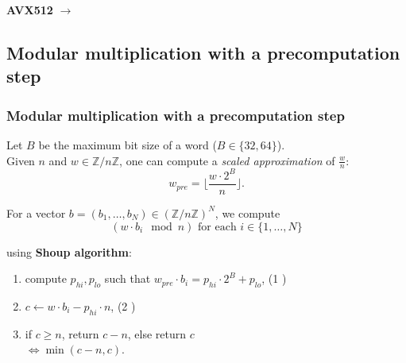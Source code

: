 \documentclass[10pt]{beamer}
\begin{document}
\begin{frame}
    \pause
    \medskip
    \textbf{AVX512} $\longrightarrow$ 
    \begin{table}[h!]
        \centering
    \end{table}
\end{frame}

\subsection{Modular multiplication with a precomputation step}
\begin{frame}
    \frametitle{Modular multiplication with a precomputation step}

    \begin{mybox}
        Let $B$ be the maximum bit size of a word ($B\in \{32, 64\}$). \\
        Given $n$ and $w \in \mathbb{Z}/n\mathbb{Z}$, one can compute a \textit{scaled approximation} 
        of $\frac{w}{n}$: $$ w_{pre} = \biggl\lfloor\dfrac{w\cdot 2^{B}}{n} \biggr\rfloor.$$
    \end{mybox}

    \pause
    \bigskip
    For a vector $b = (b_1,\dots, b_N) \in (\mathbb{Z}/n\mathbb{Z})^N$, we compute 
    $$(w\cdot b_i \mod n) \text{ for each } i\in \{1, \dots, N\}$$

    using \textbf{Shoup algorithm}\cite{Bos_Stam_2021}:
    \medskip
    \begin{enumerate}
        \item compute $p_{hi}, p_{lo}$ such that $w_{pre} \cdot b_i = p_{hi}\cdot 2^B + p_{lo}$, \hfill (1 )
        \item $c \gets w\cdot b_i - p_{hi}\cdot n$, \hfill (2 )
        \item if $c \geq n$, return $c-n$, else return $c$ \\
            $\Longleftrightarrow \min(c-n, c)$.
    \end{enumerate}
\end{frame}
\end{document}
